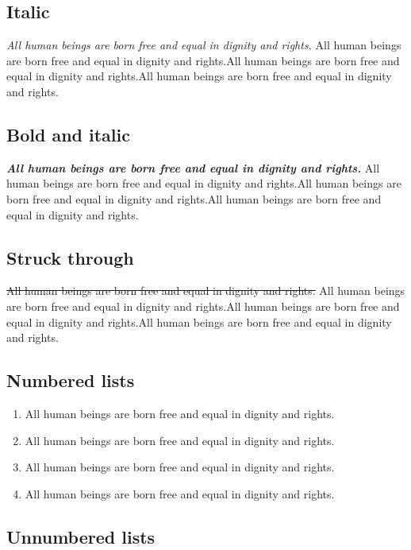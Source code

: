 \documentclass[
  english,
  american,
]{beamer}
\providecommand{\tightlist}{%
  \setlength{\itemsep}{0pt}\setlength{\parskip}{0pt}}
\begin{document}
\subsection{Italic}\label{italic}

\emph{All human beings are born free and equal in dignity and rights.}
All human beings are born free and equal in dignity and rights.All human
beings are born free and equal in dignity and rights.All human beings
are born free and equal in dignity and rights.

\subsection{Bold and italic}\label{bold-and-italic}

\textbf{\emph{All human beings are born free and equal in dignity and
rights.}} All human beings are born free and equal in dignity and
rights.All human beings are born free and equal in dignity and
rights.All human beings are born free and equal in dignity and rights.

\subsection{Struck through}\label{struck-through}

\st{All human beings are born free and equal in dignity and rights.} All
human beings are born free and equal in dignity and rights.All human
beings are born free and equal in dignity and rights.All human beings
are born free and equal in dignity and rights.

\subsection{Numbered lists}\label{numbered-lists}

\begin{enumerate}
\def\labelenumi{\arabic{enumi}.}
\tightlist
\item
  All human beings are born free and equal in dignity and rights.
\item
  All human beings are born free and equal in dignity and rights.
\item
  All human beings are born free and equal in dignity and rights.
\item
  All human beings are born free and equal in dignity and rights.
\end{enumerate}

\subsection{Unnumbered lists}\label{unnumbered-lists}
\end{document}
